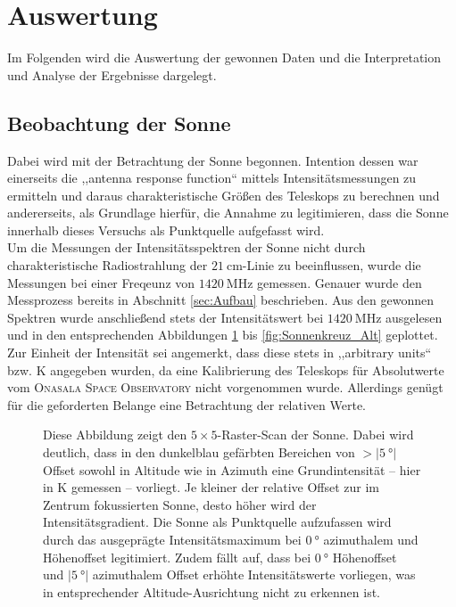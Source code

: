 \section{Auswertung}
Im Folgenden wird die Auswertung der gewonnen Daten und die Interpretation und Analyse der Ergebnisse dargelegt.
    \subsection{Beobachtung der Sonne}
    Dabei wird mit der Betrachtung der Sonne begonnen.
    Intention dessen war einerseits die ,,antenna response function`` mittels Intensitätsmessungen zu ermitteln und
    daraus charakteristische Größen des Teleskops zu berechnen und andererseits, als Grundlage hierfür, die Annahme zu legitimieren,
    dass die Sonne innerhalb dieses Versuchs als Punktquelle aufgefasst wird.\\

    Um die Messungen der Intensitätsspektren der Sonne nicht durch charakteristische Radiostrahlung der
    $\SI{21}{\centi \metre}$-Linie zu beeinflussen,
    wurde die Messungen bei einer Freqeunz von $\SI{1420}{\mega \hertz}$ gemessen.
    Genauer wurde den Messprozess bereits in Abschnitt \ref{sec:Aufbau} beschrieben. 
    Aus den gewonnen Spektren wurde anschließend stets der Intensitätswert bei $\SI{1420}{\mega \hertz}$ ausgelesen und in den entsprechenden Abbildungen \ref{fig:Sonnenabbild} bis \ref{fig:Sonnenkreuz_Alt} geplottet. 
    Zur Einheit der Intensität sei angemerkt, dass diese stets in ,,arbitrary units`` bzw. \si{\kelvin} angegeben wurden,
    da eine Kalibrierung des Teleskops für Absolutwerte vom \textsc{Onasala Space Observatory} nicht vorgenommen wurde.
    Allerdings genügt für die geforderten Belange eine Betrachtung der relativen Werte.\\

    \begin{figure}[H]
        \centering
        
        \caption[Raster-Scan der Sonne]{Diese Abbildung zeigt den $5 \times 5$-Raster-Scan der Sonne. Dabei wird deutlich, dass in den dunkelblau gefärbten Bereichen von $>\vert \SI{5}{\degree}\vert$ Offset sowohl in Altitude wie in Azimuth eine Grundintensität -- hier in \si{\kelvin} gemessen -- vorliegt. Je kleiner der relative Offset zur im Zentrum fokussierten Sonne, desto höher wird der Intensitätsgradient. Die Sonne als Punktquelle aufzufassen wird durch das ausgeprägte Intensitätsmaximum bei $\SI{0}{\degree}$ azimuthalem und Höhenoffset legitimiert. Zudem fällt auf, dass bei $\SI{0}{\degree}$ Höhenoffset und $\vert\SI{5}{\degree}\vert$ azimuthalem Offset erhöhte Intensitätswerte vorliegen, was in entsprechender Altitude-Ausrichtung nicht zu erkennen ist.}
        \label{fig:Sonnenabbild}
    \end{figure}


